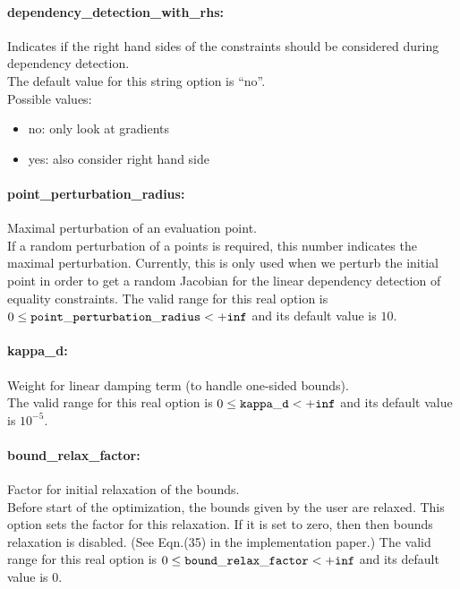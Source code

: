 \paragraph{dependency\_detection\_with\_rhs:} Indicates if the right hand sides of the constraints should be considered during dependency detection. $\;$ \\
The default value for this string option is ``no''.\\
Possible values:
\begin{itemize}
\item no:                      only look at gradients
\item yes:                     also consider right hand side
\end{itemize}

\paragraph{point\_perturbation\_radius:} Maximal perturbation of an evaluation point. $\;$ \\
     If a random perturbation of a points is required, this number indicates
     the maximal perturbation.  Currently, this is only used when we perturb
     the initial point in order to get a random Jacobian for the linear
     dependency detection of equality constraints.
The valid range for this real option is 
$0 \le {\tt point\_perturbation\_radius } <  {\tt +inf}$
and its default value is $10$.

\paragraph{kappa\_d:} Weight for linear damping term (to handle one-sided bounds). $\;$ \\
The valid range for this real option is 
$0 \le {\tt kappa\_d } <  {\tt +inf}$
and its default value is $10^{-5}$.

\paragraph{bound\_relax\_factor:} Factor for initial relaxation of the bounds. $\;$ \\
 Before start of the optimization, the bounds
given by the user are relaxed.  This option sets
the factor for this relaxation.  If it is set to
zero, then then bounds relaxation is disabled.
(See Eqn.(35) in the implementation paper.)
The valid range for this real option is 
$0 \le {\tt bound\_relax\_factor } <  {\tt +inf}$
and its default value is $0$.


